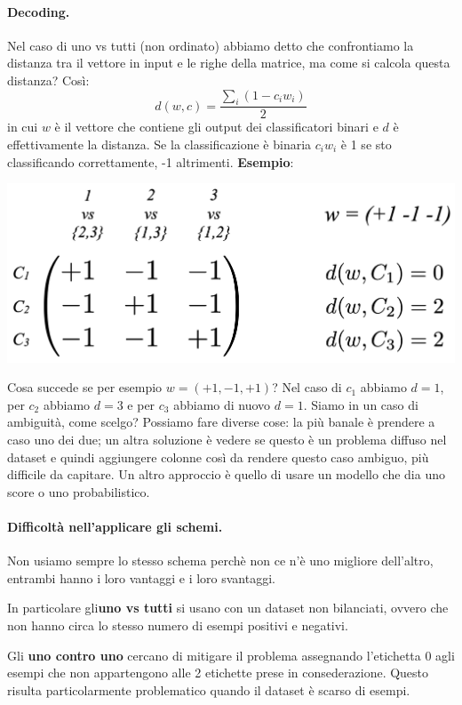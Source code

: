 \paragraph{Decoding.} Nel caso di uno vs tutti (non ordinato) abbiamo detto che confrontiamo la distanza tra il vettore in input e le righe della matrice, ma come si calcola questa distanza? Così:
\begin{equation}
    d(w,c)=\frac{\sum_i(1-c_iw_i)}{2}
\end{equation}
in cui $w$ è il vettore che contiene gli output dei classificatori binari e $d$ è effettivamente la distanza. Se la classificazione è binaria $c_iw_i$ è 1 se sto classificando correttamente, -1 altrimenti.
\textbf{Esempio}:
\begin{center}
    \includegraphics[scale=0.4]{images/matrixRis.png}    
\end{center}

Cosa succede se per esempio $w=(+1,-1,+1)$? Nel caso di $c_1$ abbiamo $d=1$, per $c_2$ abbiamo $d=3$ e per $c_3$ abbiamo di nuovo $d=1$. Siamo in un caso di ambiguità, come scelgo? Possiamo fare diverse cose: la più banale è prendere a caso uno dei due; un altra soluzione è vedere se questo è un problema diffuso nel dataset e quindi aggiungere colonne così da rendere questo caso ambiguo, più difficile da capitare. Un altro approccio è quello di usare un modello che dia uno score o uno probabilistico.

\paragraph{Difficoltà nell'applicare gli schemi.} Non usiamo sempre lo stesso schema perchè non ce n'è uno migliore dell'altro, entrambi hanno i loro vantaggi e i loro svantaggi. 

In particolare gli\textbf{uno vs tutti} si usano con un dataset non bilanciati, ovvero che non hanno circa lo stesso numero di esempi positivi e negativi.


Gli \textbf{uno contro uno} cercano di mitigare il problema assegnando l'etichetta 0 agli esempi che non appartengono alle 2 etichette prese in consederazione. Questo risulta particolarmente problematico quando il dataset è scarso di esempi.


